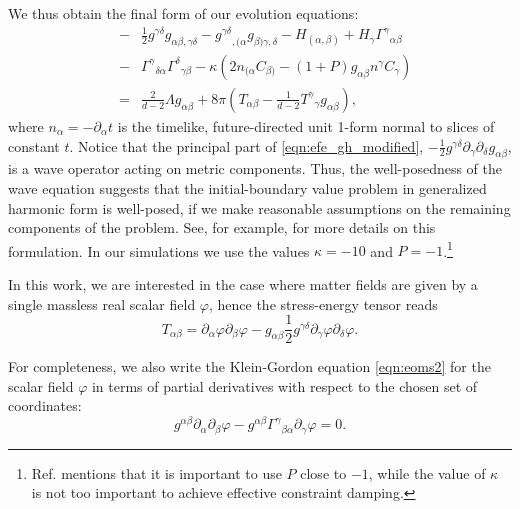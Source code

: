 \documentclass[a4paper,11pt]{article}
\numberwithin{equation}{section}
\begin{document}
We thus obtain the final form of our evolution equations:
\begin{eqnarray}
\label{eqn:efe_gh_modified}
&-& \frac{1}{2} g^{\gamma \delta} g_{\alpha\beta, \gamma \delta} - 
{g^{\gamma\delta}}_{,(\alpha} g_{\beta) \gamma, \delta} - H_{(\alpha, \beta)} + H_\gamma {\Gamma^\gamma}_{\alpha\beta} \nonumber \\
&-& {\Gamma^\gamma}_{\delta \alpha} {\Gamma^\delta}_{\gamma \beta} - \kappa \left( 2 n_{(\alpha} C_{\beta)} - (1+P) g_{\alpha\beta} n^\gamma 
C_\gamma \right) \nonumber \\
&=&  \frac{2}{d-2} \Lambda g_{\alpha\beta} + 8\pi \left( T_{\alpha\beta} - 
\frac{1}{d-2} {T^\gamma}_\gamma g_{\alpha\beta} \right),
\end{eqnarray}
where $n_\alpha=-\partial_\alpha t$ is the timelike, future-directed unit 1-form normal to slices of constant $t$.
Notice that the principal part of \eqref{eqn:efe_gh_modified}, $-\frac{1}{2} g^{\gamma \delta} \partial_\gamma \partial_\delta g_{\alpha\beta}$, is a wave operator acting on metric components. Thus, the well-posedness of the wave equation suggests that the initial-boundary value problem in generalized harmonic form is well-posed, if we make reasonable assumptions on the remaining components of the problem.
See, for example, \cite{Pretorius:2004jg,Bantilan:2012vu} for more details on this formulation. 
In our simulations we use the values $\kappa=-10$ and $P=-1$.\footnote{Ref. \cite{Bantilan:2012vu} mentions that it is important to use $P$ close to $-1$, while the value of $\kappa$ is not too important to achieve effective constraint damping.}

In this work, we are interested in the case where matter fields are given by a single massless real scalar field $\varphi$, hence the stress-energy tensor reads
\begin{equation}
\label{eq:KHmomtens}
T_{\alpha\beta}=\partial_\alpha \varphi \partial_\beta \varphi - g_{\alpha\beta} \frac{1}{2} g^{\gamma\delta} \partial_{\gamma} \varphi \partial_{\delta} \varphi.
\end{equation}

For completeness, we also write the Klein-Gordon equation \eqref{eqn:eoms2} for the scalar field $\varphi$ in terms of partial derivatives with respect to the chosen set of coordinates:
\begin{equation}\label{eqn:eoms2cart}
g^{\alpha\beta} \partial_{\alpha} \partial_{\beta} \varphi -g^{\alpha\beta} \Gamma^{\gamma}{}_{\beta\alpha}\partial_\gamma\varphi= 0.
\end{equation}
\end{document}
